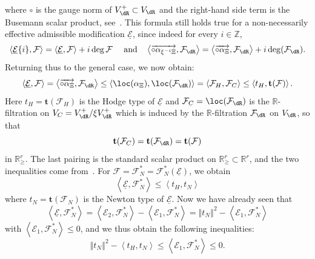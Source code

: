 where $\circ$ is the gauge norm of $V_{\dR}^{+}\subset V_{\dR}$ and the right-hand side term is the Busemann scalar product, see~\cite[6.4.15]{Co14}. This formula still holds true for a non-necessarily effective admissible modification $\underline{\mathcal{E}}$, since indeed for every $i\in\mathbb{Z}$,
\[
\left\langle \underline{\mathcal{E}}\{i\},\mathcal{F}\right\rangle =\left\langle \underline{\mathcal{E}},\mathcal{F}\right\rangle +i\deg\mathcal{F}\quad\text{ and}\quad\left\langle \overrightarrow{\circ\alpha_{\xi^{-i}\Xi}},\mathcal{F}_{\dR}\right\rangle =\left\langle \overrightarrow{\circ\alpha_{\Xi}},\mathcal{F}_{\dR}\right\rangle +i\deg(\mathcal{F}_{\dR}).
\]
Returning thus to the general case, we now obtain:
\[
\left\langle \underline{\mathcal{E}},\mathcal{F}\right\rangle =\left\langle \overrightarrow{\circ\alpha_{\Xi}},\mathcal{F}_{\dR}\right\rangle \leq\left\langle \loc(\alpha_{\Xi}),\loc(\mathcal{F}_{\dR})\right\rangle =\left\langle \mathcal{F}_{H},\mathcal{F}_{C}\right\rangle \leq\left\langle t_{H},\mathbf{t}(\mathcal{F})\right\rangle.
\]
Here $t_{H}=\mathbf{t}(\mathcal{F}_{H})$ is the Hodge type of $\underline{\mathcal{E}}$ and $\mathcal{F}_{C}=\loc(\mathcal{F}_{\dR})$ is the $\mathbb{R}$-filtration on $V_{C}=V_{\dR}^{+}/\xi V_{\dR}^{+}$ which is induced by the $\mathbb{R}$-filtration $\mathcal{F}_{\dR}$ on $V_{\dR}$, so that
\[
\mathbf{t}(\mathcal{F}_{C})=\mathbf{t}(\mathcal{F}_{\dR})=\mathbf{t}(\mathcal{F})
\]
in $\mathbb{R}_{\geq}^{r}$. The last pairing is the standard scalar product on $\mathbb{R}_{\geq}^{r}\subset\mathbb{R}^{r}$, and the two inequalities come from~\cite[4.2 \& 5.5]{Co14}. For $\mathcal{F}=\mathcal{F}_{N}^{\ast}=\mathcal{F}_{N}^{\ast}(\underline{\mathcal{E}})$, we obtain
\[
\left\langle \underline{\mathcal{E}},\mathcal{F}_{N}^{\ast}\right\rangle \leq\left\langle t_{H},t_{N}\right\rangle
\]
where $t_{N}=\mathbf{t}(\mathcal{F}_{N})$ is the Newton type of $\underline{\mathcal{E}}$. Now we have already seen that
\[
\left\langle \underline{\mathcal{E}},\mathcal{F}_{N}^{\ast}\right\rangle =\left\langle \mathcal{E}_{2},\mathcal{F}_{N}^{\ast}\right\rangle -\left\langle \mathcal{E}_{1},\mathcal{F}_{N}^{\ast}\right\rangle =\left\Vert t_{N}\right\Vert ^{2}-\left\langle \mathcal{E}_{1},\mathcal{F}_{N}^{\ast}\right\rangle
\]
with $\left\langle \mathcal{E}_{1},\mathcal{F}_{N}^{\ast}\right\rangle
\leq0$, and we thus obtain the following inequalities:
\[
\left\Vert t_{N}\right\Vert ^{2}-\left\langle t_{H},t_{N}\right\rangle \leq\left\langle \mathcal{E}_{1},\mathcal{F}_{N}^{\ast}\right\rangle \leq0.
\]

